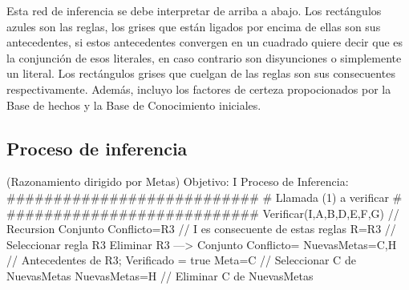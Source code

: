 \par Esta red de inferencia se debe interpretar de arriba a abajo.
Los rectángulos azules son las reglas, los grises que están ligados por encima 
de ellas son sus antecedentes, si estos antecedentes convergen en un cuadrado 
quiere decir que es la conjunción de esos literales, en caso contrario son disyunciones
o simplemente un literal. Los rectángulos grises que cuelgan de las reglas 
son sus consecuentes respectivamente. Además, incluyo los factores de certeza propocionados por
la Base de hechos y la Base de Conocimiento iniciales.

\subsection{Proceso de inferencia}
\begin{listing}[language=Pascal]
(Razonamiento dirigido por Metas)
Objetivo: I
Proceso de Inferencia: 
  ###########################
  # Llamada (1) a verificar #
  ###########################
	Verificar(I,{A,B,D,E,F,G}) // Recursion 
	Conjunto Conflicto={R3} // I es consecuente de estas reglas
	R={R3} // Seleccionar regla R3
	Eliminar R3 ---> Conjunto Conflicto={}
	NuevasMetas={C,H} // Antecedentes de R3; Verificado = true
	Meta=C // Seleccionar C de NuevasMetas
	NuevasMetas={H} // Eliminar C de NuevasMetas


\end{listing}
